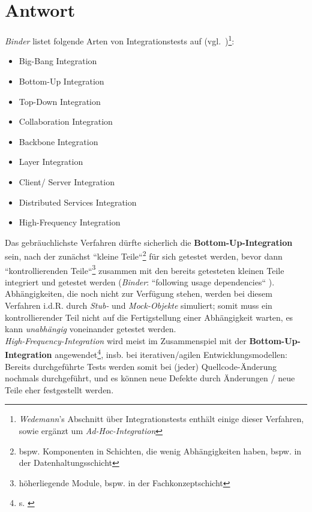 
\section*{Antwort}


\textit{Binder} listet folgende Arten von Integrationstests auf (vgl.~\cite[642]{Bin99})\footnote{
    \textit{Wedemann}'s Abschnitt über Integrationstests \cite[59]{Wed09c} enthält einige dieser Verfahren, sowie ergänzt um \textit{Ad-Hoc-Integration}
}:

\begin{itemize}
    \item Big-Bang Integration
    \item Bottom-Up Integration
    \item Top-Down Integration
    \item Collaboration Integration
    \item Backbone Integration
    \item Layer Integration
    \item Client/ Server Integration
    \item Distributed Services Integration
    \item High-Frequency Integration
\end{itemize}


\noindent
Das gebräuchlichste Verfahren dürfte sicherlich die \textbf{Bottom-Up-Integration} sein, nach der zunächst ``kleine Teile``\footnote{
bspw. Komponenten in Schichten, die wenig Abhängigkeiten haben, bspw. in der Datenhaltungsschicht
} für sich getestet werden, bevor dann ``kontrollierenden Teile``\footnote{
höherliegende Module, bspw. in der Fachkonzeptschicht
}  zusammen mit den bereits getesteten kleinen Teile integriert und getestet werden (\textit{Binder}: ``following usage dependencies`` \cite[642]{Bin99}). Abhängigkeiten, die noch nicht zur Verfügung stehen, werden bei diesem Verfahren i.d.R. durch \textit{Stub-} und \textit{Mock-Objekte} simuliert; somit muss ein kontrollierender Teil nicht auf die Fertigstellung einer Abhängigkeit warten, es kann \textit{unabhängig} voneinander getestet werden.\\
\textit{High-Frequency-Integration} wird meist im Zusammenspiel mit der \textbf{Bottom-Up-Integration} angewendet\footnote{
s. \cite[60]{Wed09c}
}, insb. bei iterativen/agilen Entwicklungsmodellen: Bereits durchgeführte Tests werden somit bei (jeder) Quellcode-Änderung nochmals durchgeführt, und es können neue Defekte durch Änderungen / neue Teile eher festgestellt werden.